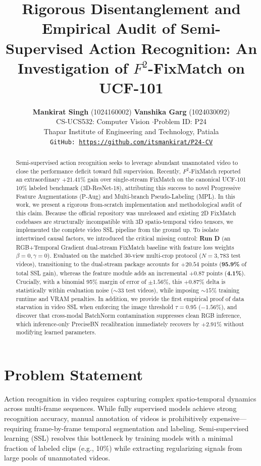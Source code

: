 \documentclass[10pt,twocolumn,a4paper]{article}
\title{\vspace{-0.6cm}\textbf{\Large Rigorous Disentanglement and Empirical Audit of Semi-Supervised Action Recognition: An Investigation of $F^2$-FixMatch on UCF-101}\vspace{-0.2cm}}
\author{
\textbf{Mankirat Singh} (1024160002) \quad \textbf{Vanshika Garg} (1024030092)\\
\normalsize CS-UCS532: Computer Vision \quad$\cdot$\quad Problem ID: P24\\
\normalsize Thapar Institute of Engineering and Technology, Patiala\\
\normalsize \texttt{GitHub: \href{https://github.com/itsmankirat/P24-CV}{https://github.com/itsmankirat/P24-CV}}
\vspace{-0.3cm}
}
\date{}
\begin{document}
\maketitle

\begin{abstract}
Semi-supervised action recognition seeks to leverage abundant unannotated video to close the performance deficit toward full supervision. Recently, $F^2$-FixMatch reported an extraordinary $+21.41\%$ gain over single-stream FixMatch on the canonical UCF-101 10\% labeled benchmark (3D-ResNet-18), attributing this success to novel Progressive Feature Augmentations (P-Aug) and Multi-branch Pseudo-Labeling (MPL). In this work, we present a rigorous from-scratch implementation and methodological audit of this claim. Because the official repository was unreleased and existing 2D FixMatch codebases are structurally incompatible with 3D spatio-temporal video tensors, we implemented the complete video SSL pipeline from the ground up. To isolate intertwined causal factors, we introduced the critical missing control: \textbf{Run D} (an RGB+Temporal Gradient dual-stream FixMatch baseline with feature loss weights $\beta=0, \gamma=0$). Evaluated on the matched 30-view multi-crop protocol ($N = 3{,}783$ test videos), transitioning to the dual-stream package accounts for $\mathbf{+20.54}$ points (\textbf{95.9\%} of total SSL gain), whereas the feature module adds an incremental $\mathbf{+0.87}$ points (\textbf{4.1\%}). Crucially, with a binomial 95\% margin of error of $\pm 1.56\%$, this $+0.87\%$ delta is statistically within evaluation noise ($\sim 33$ test videos), while imposing $\sim 15\%$ training runtime and VRAM penalties. In addition, we provide the first empirical proof of data starvation in video SSL when enforcing the image threshold $\tau=0.95$ ($-1.56\%$), and discover that cross-modal BatchNorm contamination suppresses clean RGB inference, which inference-only PreciseBN recalibration immediately recovers by $+2.91\%$ without modifying learned parameters.
\end{abstract}

\section{Problem Statement}
\label{sec:problem}
Action recognition in video requires capturing complex spatio-temporal dynamics across multi-frame sequences. While fully supervised models achieve strong recognition accuracy, manual annotation of videos is prohibitively expensive---requiring frame-by-frame temporal segmentation and labeling. Semi-supervised learning (SSL) resolves this bottleneck by training models with a minimal fraction of labeled clips (e.g., 10\%) while extracting regularizing signals from large pools of unannotated videos.
\end{document}
